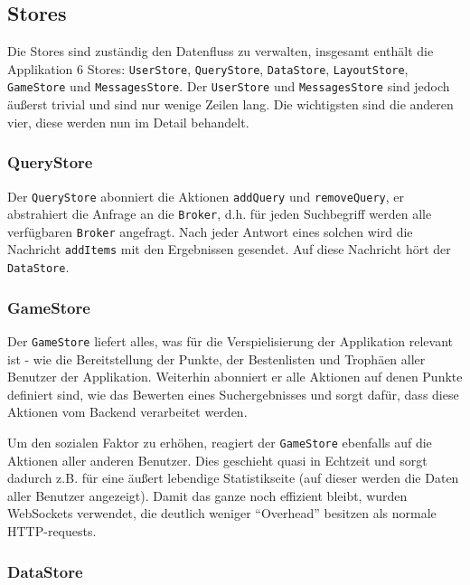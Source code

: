 \documentclass[12pt,twoside]{book}
\begin{document}
\subsection{Stores}

Die Stores sind zuständig den Datenfluss zu verwalten, insgesamt enthält die Applikation 6 Stores: \texttt{UserStore}, \texttt{QueryStore}, \texttt{DataStore}, \texttt{LayoutStore}, \texttt{GameStore} und \texttt{MessagesStore}.
Der \texttt{UserStore} und \texttt{MessagesStore} sind jedoch äußerst trivial und sind nur wenige Zeilen lang. Die wichtigsten sind die anderen vier, diese werden nun im Detail behandelt.

\subsubsection*{QueryStore}

Der \texttt{QueryStore} abonniert die Aktionen \texttt{addQuery} und \texttt{removeQuery}, er abstrahiert die Anfrage an die \texttt{Broker}, d.h. für jeden Suchbegriff werden alle verfügbaren \texttt{Broker} angefragt. Nach jeder Antwort eines solchen wird die Nachricht \texttt{addItems} mit den Ergebnissen gesendet. Auf diese Nachricht hört der \texttt{DataStore}.

\subsubsection*{GameStore}

Der \texttt{GameStore} liefert alles, was für die Verspielisierung der Applikation relevant ist - wie die Bereitstellung der Punkte, der Bestenlisten und Trophäen aller Benutzer der Applikation. Weiterhin abonniert er alle Aktionen auf denen Punkte definiert sind, wie das Bewerten eines Suchergebnisses und sorgt dafür, dass diese Aktionen vom Backend verarbeitet werden.

Um den sozialen Faktor zu erhöhen, reagiert der \texttt{GameStore} ebenfalls auf die Aktionen aller anderen Benutzer. Dies geschieht quasi in Echtzeit und sorgt dadurch z.B. für eine äußert lebendige Statistikseite (auf dieser werden die Daten aller Benutzer angezeigt).
Damit das ganze noch effizient bleibt, wurden WebSockets verwendet, die deutlich weniger ``Overhead'' besitzen als normale HTTP-requests.

\subsubsection*{DataStore}
\end{document}

